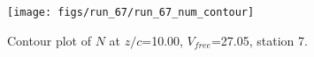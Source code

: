 \begin{figure}[H]
\centering
\texttt{[image: figs/run\_67/run\_67\_num\_contour]}
\caption{Contour plot of $N$ at $z/c$=10.00, $V_{free}$=27.05, station 7.}
\end{figure}


